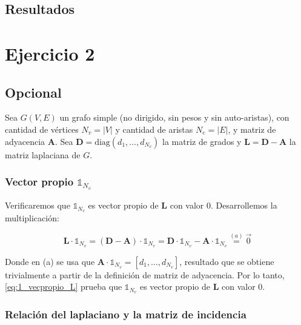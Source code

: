 \documentclass{article}
\begin{document}
\subsection{Resultados}

\section{Ejercicio 2} \label{sec: ej2}
\subsection{Opcional}

\newcommand{\ones}[1]{\mathbb{1}_{#1}}
\newcommand{\lap}{\mathbf{L}}
\newcommand{\diag}{\mathbf{D}}
\newcommand{\adj}{\mathbf{A}}
\newcommand{\bm}{\tilde{\mathbf{B}}}
\newcommand{\x}{\mathbf{x}}

Sea $G(V,E)$ un grafo simple (no dirigido, sin pesos y sin auto-aristas), con cantidad de vértices $N_v = |V|$ y cantidad de aristas $N_e = |E|$, y matriz de adyacencia $\mathbf{A}$. Sea $\mathbf{D} = \text{diag}(d_{1},\dots, d_{N_v})$ la matriz de grados y $\mathbf{L}=\mathbf{D}- \mathbf{A}$ la matriz laplaciana de $G$.
 
\subsubsection{Vector propio $\ones{N_v}$}
\label{subsec:vector_propio_1}

Verificaremos que $\ones{N_v}$ es vector propio de $\lap$ con valor 0. Desarrollemos la multiplicación:

\begin{equation}
    \lap \cdot \ones{N_v} = (\diag - \adj) \cdot \ones{N_v}  = \diag \cdot \ones{N_v} - \adj \cdot \ones{N_v} \stackrel{(a)}{=} \vec{0}
    \label{eq:1_vecpropio_L}
\end{equation}

Donde en (a) se usa que $\adj \cdot \ones{N_v} = [d_1, \dots, d_{N_v}]$, resultado que
se obtiene trivialmente a partir de la definición de matriz de adyacencia. 
Por lo tanto, \eqref{eq:1_vecpropio_L} prueba que $\ones{N_v}$ es vector propio de $\lap$ con valor 0.

\subsubsection{Relación del laplaciano y la matriz de incidencia}
\end{document}
